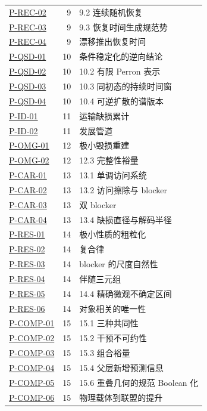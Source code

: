 \documentclass[
  11pt,
  oneside]{book}
\begin{document}
{\begin{longtable}[]{@{}lrl@{}}
\hyperref[p-rec-02]{P-REC-02} & 9 & 9.2 连续随机恢复 \\
\hyperref[p-rec-03]{P-REC-03} & 9 & 9.3 恢复时间生成规范势 \\
\hyperref[p-rec-04]{P-REC-04} & 9 & 漂移推出恢复时间 \\
\hyperref[p-qsd-01]{P-QSD-01} & 10 & 条件稳定化的逆向结论 \\
\hyperref[p-qsd-02]{P-QSD-02} & 10 & 10.2 有限 Perron 表示 \\
\hyperref[p-qsd-03]{P-QSD-03} & 10 & 10.3 同初态的持续时间窗 \\
\hyperref[p-qsd-04]{P-QSD-04} & 10 & 10.4 可逆扩散的谱版本 \\
\hyperref[p-id-01]{P-ID-01} & 11 & 运输缺损累计 \\
\hyperref[p-id-02]{P-ID-02} & 11 & 发展管道 \\
\hyperref[p-omg-01]{P-OMG-01} & 12 & 极小毁损重建 \\
\hyperref[p-omg-02]{P-OMG-02} & 12 & 12.3 完整性裕量 \\
\hyperref[p-car-01]{P-CAR-01} & 13 & 13.1 单调访问系统 \\
\hyperref[p-car-02]{P-CAR-02} & 13 & 13.2 访问擦除与 blocker \\
\hyperref[p-car-03]{P-CAR-03} & 13 & 双 blocker \\
\hyperref[p-car-04]{P-CAR-04} & 13 & 13.4 缺损直径与解码半径 \\
\hyperref[p-res-01]{P-RES-01} & 14 & 极小性质的粗粒化 \\
\hyperref[p-res-02]{P-RES-02} & 14 & 复合律 \\
\hyperref[p-res-03]{P-RES-03} & 14 & blocker 的尺度自然性 \\
\hyperref[p-res-04]{P-RES-04} & 14 & 伴随三元组 \\
\hyperref[p-res-05]{P-RES-05} & 14 & 14.4 精确微观不确定区间 \\
\hyperref[p-res-06]{P-RES-06} & 14 & 对象相关的唯一性 \\
\hyperref[p-comp-01]{P-COMP-01} & 15 & 15.1 三种共同性 \\
\hyperref[p-comp-02]{P-COMP-02} & 15 & 15.2 干预不可约性 \\
\hyperref[p-comp-03]{P-COMP-03} & 15 & 15.3 组合裕量 \\
\hyperref[p-comp-04]{P-COMP-04} & 15 & 15.4 父层新增预测信息 \\
\hyperref[p-comp-05]{P-COMP-05} & 15 & 15.6 重叠几何的规范 Boolean 化 \\
\hyperref[p-comp-06]{P-COMP-06} & 15 & 物理载体到联盟的提升 \\

\end{longtable}}
\end{document}
